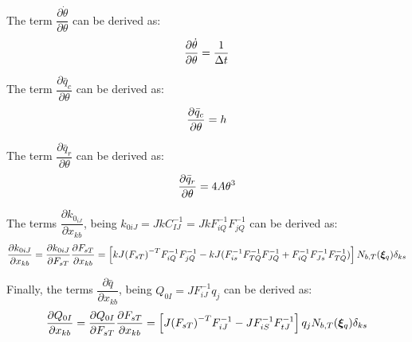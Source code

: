 \documentclass[oneside,11pt,times]{book}
\begin{document}
The term $\dfrac{\partial{\dot{\theta}}}{\partial{\theta}}$
can be derived as:
\begin{equation}
\begin{aligned}
\centering
\dfrac{\partial{\dot{\theta}}}{\partial{\theta}}=\dfrac{1}{\Delta t}
\end{aligned}
\end{equation}

The term $\dfrac{\partial{\bar{q}_c}}{\partial{\theta}}$
can be derived as:
\begin{equation}
\begin{aligned}
\centering
\dfrac{\partial{\bar{q}_c}}{\partial{\theta}}=h
\end{aligned}
\end{equation}

The term $\dfrac{\partial{\bar{q}_r}}{\partial{\theta}}$
can be derived as:
\begin{equation}
\begin{aligned}
\centering
\dfrac{\partial{\bar{q}_r}}{\partial{\theta}}=4A{\theta}^3
\end{aligned}
\end{equation}

The terms $\dfrac{\partial k_{0_{iJ}}}{\partial x_{kb}}$, being $k_{0iJ}=JkC_{IJ}^{-1}=JkF_{iQ}^{-1}F_{jQ}^{-1}$
can be derived as:
\begin{equation}
\begin{aligned}
\centering
\dfrac{\partial{k_{0iJ}}}{\partial{x_{kb}}}=\dfrac{\partial{k_{0iJ}}}{\partial{F_{sT}}}\dfrac{\partial{{F_{sT}}}}{\partial{x_{kb}}}=\left[kJ{(F_{sT})}^{-T}F_{iQ}^{-1}F_{jQ}^{-1}-kJ(F_{is}^{-1}F_{TQ}^{-1}F_{JQ}^{-1}+F_{iQ}^{-1}F_{Js}^{-1}F_{TQ}^{-1}
)\right]N_{b,T}(\bm{\xi}_q)\delta_{ks}
\end{aligned}
\end{equation}

Finally, the terms $\dfrac{\partial \bar{q}}{\partial x_{kb}}$, being $Q_{0I}=JF_{iJ}^{-1}q_{j}$
can be derived as:
\begin{equation}
\begin{aligned}
\centering
\dfrac{\partial{Q_{0I}}}{\partial{x_{kb}}}=\dfrac{\partial{Q_{0I}}}{\partial{F_{sT}}}\dfrac{\partial{{F_{sT}}}}{\partial{x_{kb}}}=\left[J{(F_{sT})}^{-T}F_{iJ}^{-1}-J
F_{iS}^{-1}F_{tJ}^{-1}
\right]q_jN_{b,T}(\bm{\xi}_q)\delta_{ks}
\end{aligned}
\end{equation}
\end{document}
